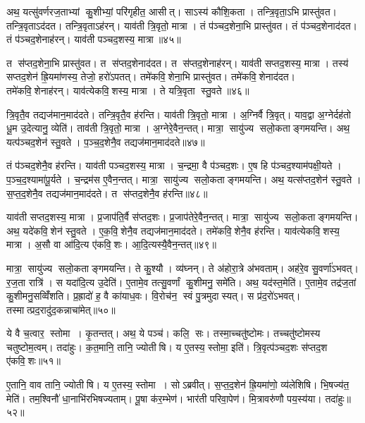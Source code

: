 अथ॒ यत्सु॑वर्णरज॒ताभ्यां कु॒शीभ्यां॒ परि॑गृहीत॒ आसीत्। साऽस्य॑ कौशि॒कता। तन्त्रि॒वृता॒ऽभि प्रास्तु॑वत। तन्त्रि॒वृताऽद॑दत। तन्त्रि॒वृताऽह॑रन्। याव॑ती त्रि॒वृतो॒ मात्रा। तं प॑ञ्चद॒शेना॒भि प्रास्तु॑वत। तं प॑ञ्चद॒शेनाद॑दत। तं प॑ञ्चद॒शेनाह॑रन्। याव॑ती पञ्चद॒शस्य॒ मात्रा॥४५॥

त स॑प्तद॒शेना॒भि प्रास्तु॑वत। त स॑प्तद॒शेनाद॑दत। त स॑प्तद॒शेनाह॑रन्। याव॑ती सप्तद॒शस्य॒ मात्रा। तस्य॑ सप्तद॒शेन॑ ह्रि॒यमा॑णस्य॒ तेजो॒ हरो॑ऽपतत्। तमे॑कवि॒शेना॒भि प्रास्तु॑वत। तमे॑कवि॒शेनाद॑दत। तमे॑कवि॒शेनाह॑रन्। याव॑त्येकवि॒शस्य॒ मात्रा। ते यत्रि॒वृता स्तु॒वते॥४६॥

त्रि॒वृतै॒व तद्यज॑मान॒माद॑दते। तन्त्रि॒वृतै॒व ह॑रन्ति। याव॑ती त्रि॒वृतो॒ मात्रा। अ॒ग्निर्वै त्रि॒वृत्। याव॒द्वा अ॒ग्नेर्दह॑तो धू॒म उ॒देत्यानु॒ व्येति॑। ताव॑ती त्रि॒वृतो॒ मात्रा। अ॒ग्नेरे॒वैन॒न्तत्। मात्रा॒ सायु॑ज्य सलो॒कताङ्गमयन्ति। अथ॒ यत्प॑ञ्चद॒शेन॑ स्तु॒वते। प॒ञ्च॒द॒शेनै॒व तद्यज॑मान॒माद॑दते॥४७॥

तं प॑ञ्चद॒शेनै॒व ह॑रन्ति। याव॑ती पञ्चद॒शस्य॒ मात्रा। च॒न्द्रमा॒ वै प॑ञ्चद॒शः। ए॒ष हि प॑ञ्चद॒श्याम॑पक्षी॒यते। प॒ञ्च॒द॒श्यामा॑पू॒र्यते। च॒न्द्रम॑स ए॒वैन॒न्तत्। मात्रा॒ सायु॑ज्य सलो॒कताङ्गमयन्ति। अथ॒ यत्स॑प्तद॒शेन॑ स्तु॒वते। स॒प्त॒द॒शेनै॒व तद्यज॑मान॒माद॑दते। त स॑प्तद॒शेनै॒व ह॑रन्ति॥४८॥

याव॑ती सप्तद॒शस्य॒ मात्रा। प्र॒जाप॑ति॒र्वै स॑प्तद॒शः। प्र॒जाप॑तेरे॒वैन॒न्तत्। मात्रा॒ सायु॑ज्य सलो॒कताङ्गमयन्ति। अथ॒ यदे॑कवि॒शेन॑ स्तु॒वते। ए॒क॒वि॒शेनै॒व तद्यज॑मान॒माद॑दते। तमे॑कवि॒शेनै॒व ह॑रन्ति। याव॑त्येकवि॒शस्य॒ मात्रा। अ॒सौ वा आ॑दि॒त्य ए॑कवि॒शः। आ॒दि॒त्यस्यै॒वैन॒न्तत्॥४९॥

मात्रा॒ सायु॑ज्य सलो॒कताङ्गमयन्ति। ते कु॒श्यौ। व्य॑घ्नन्। ते अ॑होरा॒त्रे अ॑भवताम्। अह॑रे॒व सु॒वर्णा॑ऽभवत्। र॒ज॒ता रात्रि॑। स यदा॑दि॒त्य उ॒देति॑। ए॒तामे॒व तत्सु॒वर्णां कु॒शीमनु॒ समे॑ति। अथ॒ यद॑स्त॒मेति॑। ए॒तामे॒व तद्र॑ज॒तां कु॒शीमनु॒सव्विँ॑शति। प्र॒ह्रादो॑ ह॒ वै का॑याध॒वः। वि॒रोच॑न॒ स्वं पु॒त्रमुदास्यत्। स प्र॑द॒रो॑ऽभवत्। तस्मात्प्रद॒रादु॑द॒कन्नाचा॑मेत्॥५०॥\anuvakamend[आ॒दि॒त्यः प॑ञ्चद॒शस्य॒ मात्रा स्तु॒वते॑ पञ्चद॒शेनै॒व तद्यज॑मान॒माद॑दते सप्तद॒शेनै॒व ह॑रन्त्यादि॒त्यस्यै॒वैनं॒ तद्वि॑शति च॒त्वारि॑ च]

ये वै च॒त्वार॒ स्तोमा। कृ॒तन्तत्। अथ॒ ये पञ्च॑। कलि॒ सः। तस्मा॒च्चतु॑ष्टोमः। तच्चतु॑ष्टोमस्य चतुष्टोम॒त्वम्। तदा॑हुः। क॒त॒मानि॒ तानि॒ ज्योतीषि। य ए॒तस्य॒ स्तोमा॒ इति॑। त्रि॒वृत्प॑ञ्चद॒शः स॑प्तद॒श ए॑कवि॒शः॥५१॥

ए॒तानि॒ वाव तानि॒ ज्योतीषि। य ए॒तस्य॒ स्तोमा। सोऽब्रवीत्। स॒प्त॒द॒शेन॑ ह्रि॒यमा॑णो॒ व्य॑लेशिषि। भि॒षज्य॑त॒ मेति॑। तम॒श्विनौ॑ धा॒नाभि॑रभिषज्यताम्। पू॒षा क॑र॒म्भेण॑। भार॑ती परिवा॒पेण॑। मि॒त्रावरु॑णौ पय॒स्य॑या। तदा॑हुः॥५२॥

